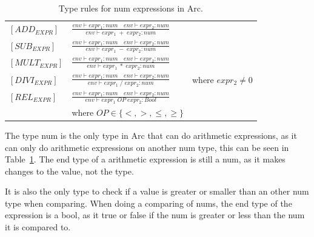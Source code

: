 \begin{table}[htb!]
    \centering
    \begin{tabular}{lll}
        \toprule
        $[ADD_{EXPR}] $                         & $\frac
            {env\vdash expr_1: num \quad env\vdash expr_2: num}
            {env\vdash expr_1 \;+\;expr_2: num}$
        \\ [12pt]
        $[SUB_{EXPR}] $                         & $\frac
            {env\vdash expr_1: num \quad env\vdash expr_2: num}
            {env\vdash expr_1 \;-\;expr_2: num}$
        \\ [12pt]
        $[MULT_{EXPR}] $                        & $\frac
            {env\vdash expr_1: num \quad env\vdash expr_2: num}
            {env\vdash expr_1 \;*\;expr_2: num}$
        \\ [12pt]
        $[DIVI_{EXPR}] $                        & $\frac
            {env\vdash expr_1: num \quad env\vdash expr_2: num}
        {env\vdash expr_1 \; / \; expr_2: num}$ & where $expr_2 \neq 0$
        \\ [12pt]
        $[REL_{EXPR}] $                         & $\frac
            {env\vdash expr_1: num \quad env\vdash expr_2: num}
            {env\vdash expr_1 \; OP \; expr_2: Bool}$                                 \\

                                                & where $OP \in \{<, >, \leq, \geq\}$

        \\
        \bottomrule
    \end{tabular}
    \caption{Type rules for num expressions in Arc.}
    \label{tab:num-rules}
\end{table}


The type num is the only type in Arc that can do arithmetic expressions, as it can only do arithmetic expressions on another num type, this can be seen in Table~\ref{tab:num-rules}. The end type of a arithmetic expression is still a num, as it makes changes to the value, not the type.

It is also the only type to check if a value is greater or smaller than an other num type when comparing. When doing a comparing of nums, the end type of the expression is a bool, as it true or false if the num is greater or less than the num it is compared to.


